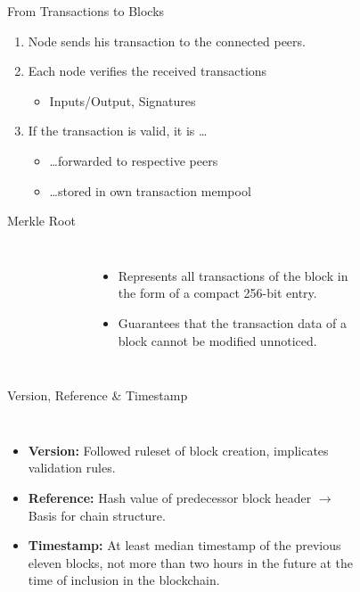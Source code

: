 \documentclass[]{beamer}
\begin{document}
\begin{frame}{From Transactions to Blocks}
	\begin{enumerate}
		\item<1-> Node sends his transaction to the connected peers.
		\item<2-> Each node verifies the received transactions
			\begin{itemize}
				\item<2-> Inputs/Output, Signatures
			\end{itemize}			 
		\item<3->  If the transaction is valid, it is \dots
			\begin{itemize}
				\item<3-> \dots forwarded to respective peers
				\item<3-> \dots stored in own transaction mempool
			\end{itemize}
	\end{enumerate}	
\end{frame}

\begin{frame}{Merkle Root}
\begin{columns}
\begin{figure}
	
\end{figure}
\begin{itemize}
	\item Represents all transactions of the block in the form of a compact 256-bit entry.
	\item Guarantees that the transaction data of a block cannot be modified unnoticed.
\end{itemize}

\begin{figure}
	
\end{figure}
\end{columns}
\end{frame}


\begin{frame}{Version, Reference \& Timestamp}
\begin{columns}
\begin{itemize}
	\item \textbf{Version:} Followed ruleset of block creation, implicates validation rules.
	\item \textbf{Reference:} Hash value of predecessor block header $\rightarrow$ Basis for chain structure.
	\item \textbf{Timestamp:} At least median timestamp of the previous eleven blocks, not more than two hours in the future at the time of inclusion in the blockchain. 
\end{itemize}
\begin{figure}
	
\end{figure}
\end{columns}
\end{frame}
\end{document}
